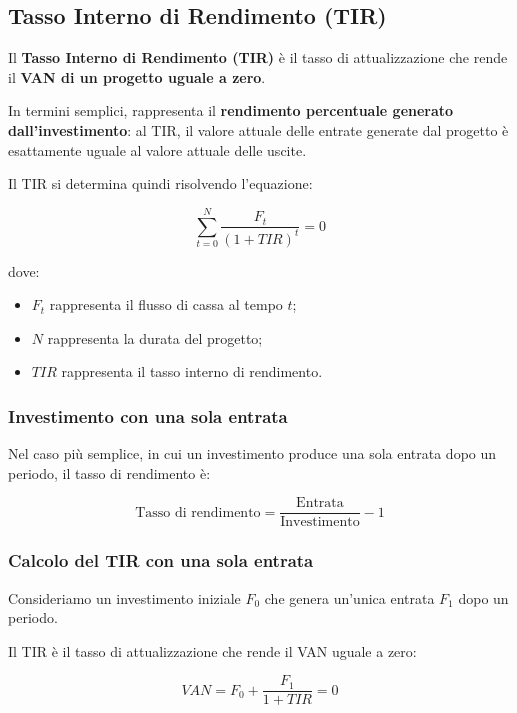 \subsection{Tasso Interno di Rendimento (TIR)}

\noindent Il \textbf{Tasso Interno di Rendimento (TIR)} è il tasso di attualizzazione che rende il \textbf{VAN di un progetto uguale a zero}.

\medskip

\noindent In termini semplici, rappresenta il \textbf{rendimento percentuale generato dall'investimento}: al TIR, il valore attuale delle entrate generate dal progetto è esattamente uguale al valore attuale delle uscite.

\medskip

\noindent Il TIR si determina quindi risolvendo l'equazione:

\[
\boxed{
\sum_{t=0}^{N}
\frac{F_t}{(1+TIR)^t}
=0
}
\]

\noindent dove:

\begin{itemize}
    \item $F_t$ rappresenta il flusso di cassa al tempo $t$;
    \item $N$ rappresenta la durata del progetto;
    \item $TIR$ rappresenta il tasso interno di rendimento.
\end{itemize}

\subsubsection*{Investimento con una sola entrata}

\noindent Nel caso più semplice, in cui un investimento produce una sola entrata dopo un periodo, il tasso di rendimento è:

\[
\boxed{
\text{Tasso di rendimento}
=
\frac{\text{Entrata}}{\text{Investimento}}-1
}
\]

\subsubsection*{Calcolo del TIR con una sola entrata}

\noindent Consideriamo un investimento iniziale $F_0$ che genera un'unica entrata $F_1$ dopo un periodo.

\noindent Il TIR è il tasso di attualizzazione che rende il VAN uguale a zero:

\[
VAN
=
F_0+
\frac{F_1}{1+TIR}
=
0
\]

